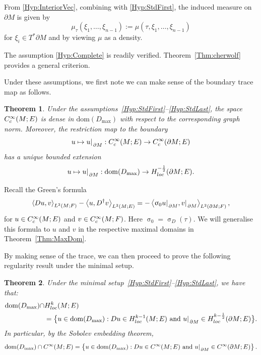 \documentclass[a4paper,10pt,reqno]{amsart}
\newcommand{\sym}{\upsigma}
\newcommand{\rest}[1]{{{\lvert_{}}_{}}_{#1}}
\newcommand{\dbrac}[1]{\left\{#1\right\}}
\newcommand{\set}[1]{\dbrac{#1}}
\newcommand{\Lp}[2][{}]{{\rm L}^{#2}_{\rm #1}}%
\newcommand{\Ck}[2][{}]{{\rm C}^{#2}_{\rm #1}}%
\newcommand{\Hard}[2][{}]{{\rm H}^{#2}_{\rm #1}}%
\newcommand{\SobH}[2][{}]{\Hard[#1]{\rm #2}}
\newcommand{\dom}{\mathrm{dom}}
\newcommand{\intersect}{\cap}
\newcommand{\inprod}[1]{\left\langle #1 \right\rangle}%
\newcommand{\dM}{\partial M}
\newtheorem{theorem}{Theorem}[section]
\theoremstyle{definition}
\begin{document}
From \ref{Hyp:InteriorVec}, combining with \ref{Hyp:StdFirst}, the induced measure on $\dM$ is given by
$$\mu_{\tau}(\xi_1, \dots, \xi_{n-1}) := \mu(\tau, \xi_1, \dots, \xi_{n-1})$$
for $\xi_i \in T^\ast \dM$ and by viewing $\mu$ as a density.

The assumption \ref{Hyp:Complete} is readily verified.
Theorem~\ref{Thm:cherwolf} provides a general criterion.

Under these assumptions, we first note we can make sense of the boundary trace map as follows.

\begin{theorem}
\label{Thm:Trace1}
Under the assumptions~\ref{Hyp:StdFirst}--\ref{Hyp:StdLast}, the space $\Ck[c]{\infty}(M;E)$ is dense in $\dom(D_{\max})$  with respect to the corresponding graph norm.
Moreover, the restriction map to the boundary
$$u \mapsto u \rest{\partial M}: \Ck[c]{\infty}(M;E) \to \Ck[c]{\infty}(\partial M;E)$$
has a unique bounded extension
$$ u \mapsto u\rest{\partial M}: \dom(D_{\max}) \to \SobH[loc]{-\frac12}(\partial M;E).$$
\end{theorem}

Recall the Green's formula
\begin{equation}
\label{A:IntParts}
\inprod{D u, v}_{\Lp{2}(M; F)} - \inprod{u, D^\dagger v}_{\Lp{2}(M; E)} = -\inprod{\sym_0 u\rest{\dM}, v\rest{\dM}}_{\Lp{2}(\dM;F)},
\end{equation}
for $u \in \Ck[c]{\infty}(M;E)$ and $v \in \Ck[c]{\infty}(M;F)$.
Here $\sym_0=\sym_D(\tau)$.
We will generalise this formula to $u$ and $v$ in the respective maximal domains in Theorem~\ref{Thm:MaxDom}.

By making sense of the trace, we can then proceed to prove the following regularity result under the minimal setup.

\begin{theorem}
\label{Thm:Reg}
Under the minimal setup~\ref{Hyp:StdFirst}--\ref{Hyp:StdLast}, we have that:
\begin{align}
\label{Eq:MaxDom}
\dom(D_{\max}) \intersect & \SobH[loc]{k}(M;E) \notag \\
                          & =
\big\{ u \in \dom(D_{\max}): Du \in \SobH[loc]{k-1}(M;E)\text{ and } u\rest{\dM} \in \SobH[loc]{k-\frac{1}{2}}(\dM;E)\big\}.
\end{align}
In particular, by the Sobolev embedding theorem,
\begin{align*}
\dom(D_{\max}) \intersect \Ck{\infty}(M;E)
=
\set{ u \in \dom(D_{\max}): Du \in \Ck{\infty}(M;E)\text{ and } u\rest{\dM} \in \Ck{\infty}(\dM;E)}.
\end{align*}

\end{theorem}
\end{document}
